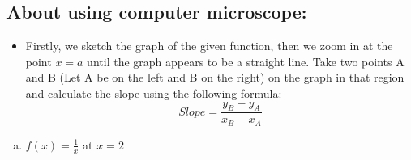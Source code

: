 \documentclass[12pt,en,a4paper]{article}
\begin{document}
	\subsection*{About using computer microscope:}
	\begin{itemize}
		\item Firstly, we sketch the graph of the given function, then we zoom in at the point \(x = a\) until the graph appears to be a straight line. Take two points A and B (Let A be on the left and B on the right) on the graph in that region and calculate the slope using the following formula:
		\[Slope=\frac{y_{B}-y_{A}}{x_{B}-x_{A}}\]
	\end{itemize}
	\begin{enumerate}[a)]
		\item \(f(x)=\frac{1}{x}\) at \(x=2\)
	\end{enumerate}
\end{document}
